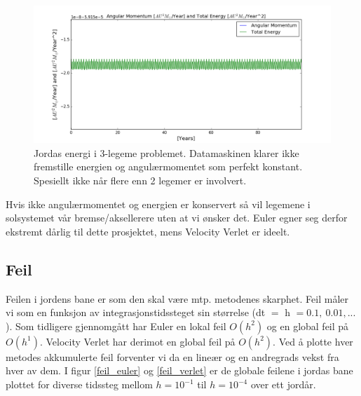 \documentclass[11pt,a4paper]{article}
\begin{document}
\begin{figure}
 \centering
 \includegraphics[scale=0.5]{wat.png}
 \caption{Jordas energi i 3-legeme problemet. Datamaskinen klarer ikke fremstille energien og angulærmomentet som perfekt konstant. Spesiellt ikke når flere enn 2 legemer er involvert.}
 \label{ang3}
\end{figure}
Hvis ikke angulærmomentet og energien er konservert så vil legemene i solsystemet vår bremse/aksellerere uten at vi ønsker det. Euler egner seg derfor ekstremt dårlig til dette prosjektet, mens Velocity Verlet er ideelt.

\subsection{Feil}
Feilen i jordens bane er som den skal være mtp. metodenes skarphet.
Feil måler vi som en funksjon av integrasjonstidssteget sin størrelse (dt $=$ h $= 0.1, \ 0.01, ...$).
Som tidligere gjennomgått har Euler en lokal feil $O(h^{2})$ og en global feil på $O(h^{1})$.
Velocity Verlet har derimot en global feil på $O(h^{2})$. Ved å plotte hver metodes akkumulerte feil forventer vi da en lineær og en andregrads vekst fra hver av dem.
I figur \ref{feil_euler} og \ref{feil_verlet} er de globale feilene i jordas bane plottet for diverse tidssteg mellom $h=10^{-1}$ til $h=10^{-4}$ over ett jordår.\\
\end{document}
